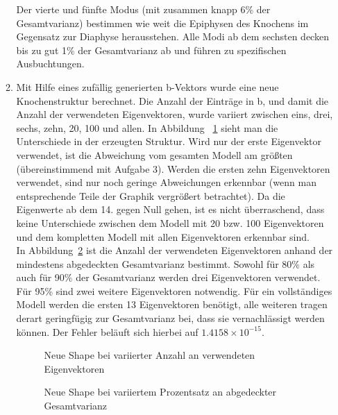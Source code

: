 \documentclass[]{report}
\newlength\figureheight
\newlength\figurewidth
\begin{document}
\begin{enumerate}
\begin{enumerate}
			Der vierte und fünfte Modus (mit zusammen knapp 6\% der Gesamtvarianz) bestimmen wie weit die Epiphysen des Knochens im Gegensatz zur Diaphyse herausstehen.
			Alle Modi ab dem sechsten decken bis zu gut 1\% der Gesamtvarianz ab und führen zu spezifischen Ausbuchtungen.
			\item
			Mit Hilfe eines zufällig generierten b-Vektors wurde eine neue Knochenstruktur berechnet. Die Anzahl der Einträge in b, und damit die Anzahl der verwendeten Eigenvektoren, wurde variiert zwischen eins, drei, sechs, zehn, 20, 100 und allen. In Abbildung ~\ref{fig:shapesK} sieht man die Unterschiede in der erzeugten Struktur. Wird nur der erste Eigenvektor verwendet, ist die Abweichung vom gesamten Modell am größten (übereinstimmend mit Aufgabe 3). Werden die ersten zehn Eigenvektoren verwendet, sind nur noch geringe Abweichungen erkennbar (wenn man entsprechende Teile der Graphik vergrößert betrachtet). Da die Eigenwerte ab dem 14. gegen Null gehen, ist es nicht überraschend, dass keine Unterschiede zwischen dem Modell mit 20 bzw. 100 Eigenvektoren und dem kompletten Modell mit allen Eigenvektoren erkennbar sind.\\
			In Abbildung~\ref{fig:shapesVar} ist die Anzahl der verwendeten Eigenvektoren anhand der mindestens abgedeckten Gesamtvarianz bestimmt. Sowohl für 80\% als auch für 90\% der Gesamtvarianz werden drei Eigenvektoren verwendet. Für 95\% sind zwei weitere Eigenvektoren notwendig. Für ein vollständiges Modell werden die ersten 13 Eigenvektoren benötigt, alle weiteren tragen derart geringfügig zur Gesamtvarianz bei, dass sie vernachlässigt werden können. Der Fehler beläuft sich hierbei auf $1.4158\times 10^{-15}$.
			\setlength\figureheight{4cm}
			\setlength{}
			\begin{figure}
				\centering
				
				\caption{Neue Shape bei variierter Anzahl an verwendeten Eigenvektoren}
				\label{fig:shapesK}
			\end{figure}
			\qquad
			\begin{figure}
				\centering
				
				\caption{Neue Shape bei variiertem Prozentsatz an abgedeckter Gesamtvarianz}
				\label{fig:shapesVar}
			\end{figure}
		\end{enumerate}
	\end{enumerate}
	
\end{document}
